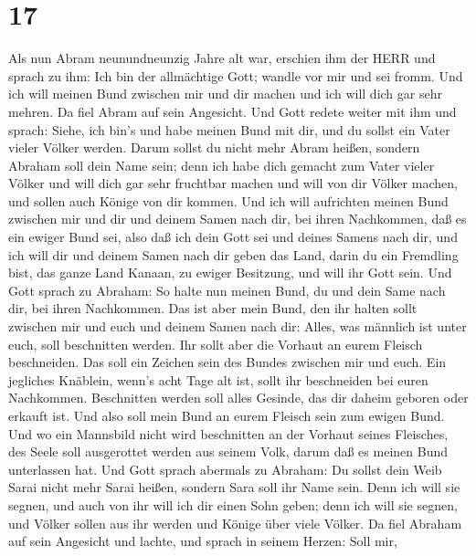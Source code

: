 \hypertarget{section-16}{%
\section{17}\label{section-16}}

 Als nun Abram neunundneunzig Jahre alt war, erschien ihm
der HERR und sprach zu ihm: Ich bin der allmächtige Gott; wandle vor mir
und sei fromm.  Und ich will meinen Bund zwischen mir und
dir machen und ich will dich gar sehr mehren.  Da fiel Abram
auf sein Angesicht. Und Gott redete weiter mit ihm und sprach:
 Siehe, ich bin's und habe meinen Bund mit dir, und du
sollst ein Vater vieler Völker werden.  Darum sollst du
nicht mehr Abram heißen, sondern Abraham soll dein Name sein; denn ich
habe dich gemacht zum Vater vieler Völker  und will dich gar
sehr fruchtbar machen und will von dir Völker machen, und sollen auch
Könige von dir kommen.  Und ich will aufrichten meinen Bund
zwischen mir und dir und deinem Samen nach dir, bei ihren Nachkommen,
daß es ein ewiger Bund sei, also daß ich dein Gott sei und deines Samens
nach dir,  und ich will dir und deinem Samen nach dir geben
das Land, darin du ein Fremdling bist, das ganze Land Kanaan, zu ewiger
Besitzung, und will ihr Gott sein.  Und Gott sprach zu
Abraham: So halte nun meinen Bund, du und dein Same nach dir, bei ihren
Nachkommen.  Das ist aber mein Bund, den ihr halten sollt
zwischen mir und euch und deinem Samen nach dir: Alles, was männlich ist
unter euch, soll beschnitten werden.  Ihr sollt aber die
Vorhaut an eurem Fleisch beschneiden. Das soll ein Zeichen sein des
Bundes zwischen mir und euch.  Ein jegliches Knäblein,
wenn's acht Tage alt ist, sollt ihr beschneiden bei euren Nachkommen.
 Beschnitten werden soll alles Gesinde, das dir daheim
geboren oder erkauft ist. Und also soll mein Bund an eurem Fleisch sein
zum ewigen Bund.  Und wo ein Mannsbild nicht wird
beschnitten an der Vorhaut seines Fleisches, des Seele soll ausgerottet
werden aus seinem Volk, darum daß es meinen Bund unterlassen hat.
 Und Gott sprach abermals zu Abraham: Du sollst dein Weib
Sarai nicht mehr Sarai heißen, sondern Sara soll ihr Name sein.
 Denn ich will sie segnen, und auch von ihr will ich dir
einen Sohn geben; denn ich will sie segnen, und Völker sollen aus ihr
werden und Könige über viele Völker.  Da fiel Abraham auf
sein Angesicht und lachte, und sprach in seinem Herzen: Soll mir,
